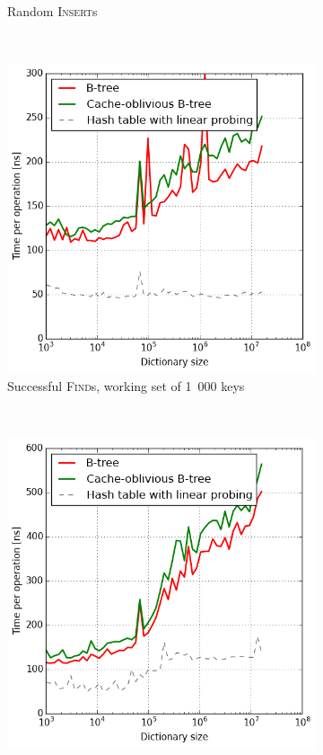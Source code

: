 \begin{figure}
\begin{subfigure}[t]{0.45\textwidth}
	\caption{Random \textsc{Insert}s}
\end{subfigure}
~
\begin{subfigure}[t]{0.45\textwidth}
	\includegraphics[width=\textwidth]{img/performance/cob-performance-3}
	\caption{Successful \textsc{Find}s, working set of 1~000 keys}
\end{subfigure}
~
\begin{subfigure}[t]{0.45\textwidth}
	\includegraphics[width=\textwidth]{img/performance/cob-performance-4}

\end{subfigure}
\end{figure}
